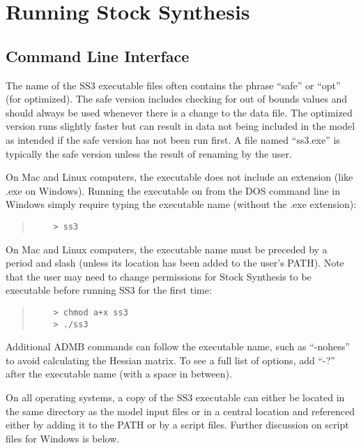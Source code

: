 \section{Running Stock Synthesis} \label{sec:RunningSS}

\subsection{Command Line Interface}
The name of the SS3 executable files often contains the phrase ``safe'' or ``opt'' (for optimized). The safe version includes checking for out of bounds values and should always be used whenever there is a change to the data file. The optimized version runs slightly faster but can result in data not being included in the model as intended if the safe version has not been run first. A file named ``ss3.exe'' is typically the safe version unless the result of renaming by the user.

On Mac and Linux computers, the executable does not include an extension (like .exe on Windows).
Running the executable on from the DOS command line in Windows simply require typing the executable name (without the .exe extension):
\begin{quote}
	\begin{verbatim}
	> ss3
	\end{verbatim}
\end{quote}


On Mac and Linux computers, the executable name must be preceded by a period and slash (unless its location has been added to the user's PATH). Note that the user may need to change permissions for Stock Synthesis to be executable before running SS3 for the first time:

\begin{quote}
	\begin{verbatim}
	> chmod a+x ss3
	> ./ss3
	\end{verbatim}
\end{quote}

Additional ADMB commands can follow the executable name, such as ``-nohess'' to avoid calculating the Hessian matrix. To see a full list of options, add ``-?'' after the executable name (with a space in between).

On all operating systems, a copy of the SS3 executable can either be located in the same directory as the model input files or in a central location and referenced either by adding it to the PATH or by a script files. Further discussion on script files for Windows is below.

